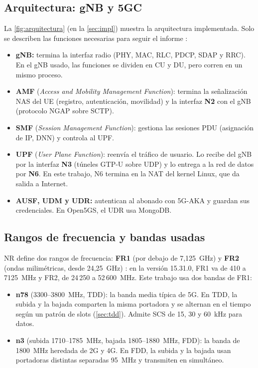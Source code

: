 \subsection{Arquitectura: gNB y 5GC}
La \cref{fig:arquitectura} (en la \cref{sec:impl}) muestra la arquitectura implementada. Solo se describen las funciones necesarias para seguir el informe \cite{ts38300}:
\begin{itemize}
  \item \textbf{gNB:} termina la interfaz radio (PHY, MAC, RLC, PDCP, SDAP y RRC). En el gNB usado, las funciones se dividen en CU y DU, pero corren en un mismo proceso.
  \item \textbf{AMF} (\emph{Access and Mobility Management Function}): termina la señalización NAS del UE (registro, autenticación, movilidad) y la interfaz \textbf{N2} con el gNB (protocolo NGAP sobre SCTP).
  \item \textbf{SMF} (\emph{Session Management Function}): gestiona las sesiones PDU (asignación de IP, DNN) y controla al UPF.
  \item \textbf{UPF} (\emph{User Plane Function}): reenvía el tráfico de usuario. Lo recibe del gNB por la interfaz \textbf{N3} (túneles GTP-U sobre UDP) y lo entrega a la red de datos por \textbf{N6}. En este trabajo, N6 termina en la NAT del kernel Linux, que da salida a Internet.
  \item \textbf{AUSF, UDM y UDR:} autentican al abonado con 5G-AKA y guardan sus credenciales. En Open5GS, el UDR usa MongoDB.
\end{itemize}

\subsection{Rangos de frecuencia y bandas usadas}
NR define dos rangos de frecuencia: \textbf{FR1} (por debajo de 7,125~GHz) y \textbf{FR2} (ondas milimétricas, desde 24,25~GHz) \cite[tabla~5.1-1]{ts38101}: en la versión 15.31.0, FR1 va de 410 a 7125~MHz y FR2, de 24\,250 a 52\,600~MHz. Este trabajo usa dos bandas de FR1:
\begin{itemize}
  \item \textbf{n78} (3300--3800~MHz, TDD): la banda media típica de 5G. En TDD, la subida y la bajada comparten la misma portadora y se alternan en el tiempo según un patrón de slots (\cref{sec:tdd}). Admite SCS de 15, 30 y 60~kHz para datos.
  \item \textbf{n3} (subida 1710--1785~MHz, bajada 1805--1880~MHz, FDD): la banda de 1800~MHz heredada de 2G y 4G. En FDD, la subida y la bajada usan portadoras distintas separadas 95~MHz y transmiten en simultáneo.
\end{itemize}

